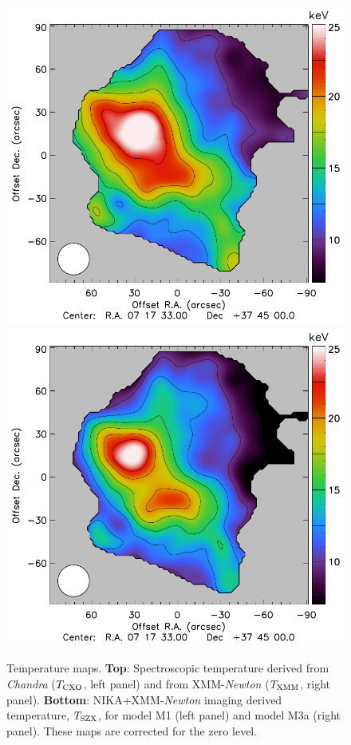 \documentclass[twocolumn,traditabstract]{aa}
\newcommand{\ccor}[1]{\textcolor{Mypink}{#1}}
\def\TSZ {T_{\rm SZX}}
\def \TXC {T_{\rm CXO}}
\def \TXX {T_{\rm XMM}}
\begin{document}
\begin{figure}[h]
\includegraphics[trim=0cm 0cm 1.4cm 0cm, clip=true, totalheight=7.6cm]{Figure/Thermo_TSZclean1.pdf}
\includegraphics[trim=0cm 0cm 0cm 0cm, clip=true, totalheight=7.6cm]{Figure/Thermo_TSZclean8.pdf}
\caption{\footnotesize{\ccor{Temperature maps. {\bf Top}: Spectroscopic temperature derived from \textit{Chandra} ($\TXC$, left panel) and from XMM-\textit{Newton} ($\TXX$, right panel). {\bf Bottom}: NIKA+XMM-\textit{Newton} imaging derived temperature, $\TSZ$, for model M1 (left panel) and model M3a (right panel). These maps are corrected for the zero level.}}}
\label{fig:T_maps}
\end{figure}
\end{document}
